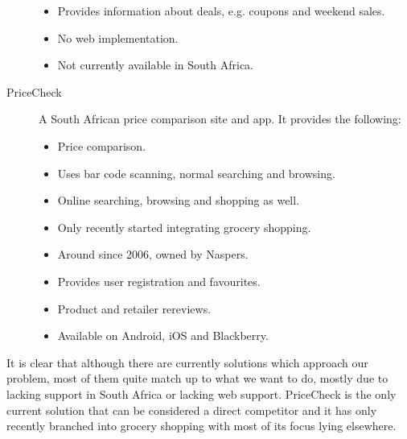 \begin{description}
\begin{itemize}
\item Provides information about deals, e.g. coupons and weekend sales.
\item No web implementation.
\item Not currently available in South Africa.
\end{itemize}
\item[PriceCheck~\cite{pricecheck}] A South African price comparison site and app. It provides the following:
\begin{itemize}
\item Price comparison.
\item Uses bar code scanning, normal searching and browsing.
\item Online searching, browsing and shopping as well.
\item Only recently started integrating grocery shopping.
\item Around since 2006, owned by Naspers.
\item Provides user registration and favourites.
\item Product and retailer rereviews.
\item Available on Android, iOS and Blackberry.
\end{itemize}
\end{description}
It is clear that although there are currently solutions which approach our problem, most of them quite match up to what we want to do, mostly due to lacking support in South Africa or lacking web support. PriceCheck is the only current solution that can be considered a direct competitor and it has only recently branched into grocery shopping with most of its focus lying elsewhere.
